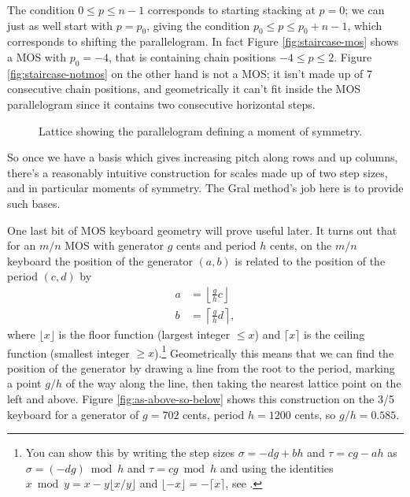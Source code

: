 \documentclass[a4paper,11pt]{article}
\begin{document}
The condition $0 \leq p \leq n-1$ corresponds to starting stacking at $p=0$; we
can just as well start with $p=p_0$, giving the condition $p_0 \leq p \leq p_0
+ n -1$, which corresponds to shifting the parallelogram. In fact Figure
\ref{fig:staircase-mos} shows a MOS with $p_0 = -4$, that is containing chain
positions $-4 \leq p \leq 2$. Figure \ref{fig:staircase-notmos} on the other
hand is not a MOS; it isn't made up of 7 consecutive chain positions, and
geometrically it can't fit inside the MOS parallelogram since it contains two
consecutive horizontal steps.

\begin{figure}
\begin{subfigure}{0.5\textwidth}

\caption{}
\label{fig:lattice-keyboard}
\end{subfigure}\hspace{0.05 \textwidth}
\begin{subfigure}{0.5\textwidth}

\vspace{1.35cm}
\caption{}
\label{fig:lattice-parallelogram}
\end{subfigure}
\caption{Lattice showing the parallelogram defining a moment of symmetry.}
\label{fig:lattice}
\end{figure}

So once we have a basis which gives increasing pitch along rows and up columns,
there's a reasonably intuitive construction for scales made up of two step
sizes, and in particular moments of symmetry. The Gral method's job here is to
provide such bases.

One last bit of MOS keyboard geometry will prove useful later. It turns out
that for an $m/n$ MOS with generator $g$ cents and period $h$ cents, on the
$m/n$ keyboard the position of the generator $(a, b)$ is related to the
position of the period $(c, d)$ by
\begin{align}
    a   &=  \left\lfloor \frac{g}{h} c \right\rfloor    \label{eq:floor} \\
    b   &=  \left\lceil  \frac{g}{h} d \right\rceil,    \label{eq:ceil}
\end{align}
where $\lfloor x \rfloor$ is the floor function (largest integer $\leq x$) and
$\lceil x \rceil$ is the ceiling function (smallest integer $\geq
x$).\footnote{You can show this by writing the step sizes $\sigma = -dg + bh$
and $\tau = cg - ah$ as $\sigma = (-dg)\bmod h$ and $\tau = cg \bmod h$ and
using the identities $x \bmod y = x - y \lfloor x/y \rfloor$ and $\lfloor -x
\rfloor = - \lceil x \rceil$, see \cite[Chapter~3]{knuth1994concrete}.}
Geometrically this means that we can find the position of the generator by
drawing a line from the root to the period, marking a point $g/h$ of the way
along the line, then taking the nearest lattice point on the left and above.
Figure \ref{fig:as-above-so-below} shows this construction on the 3/5 keyboard
for a generator of $g = 702$ cents, period $h = 1200$ cents, so $g/h = 0.585$.
\end{document}
